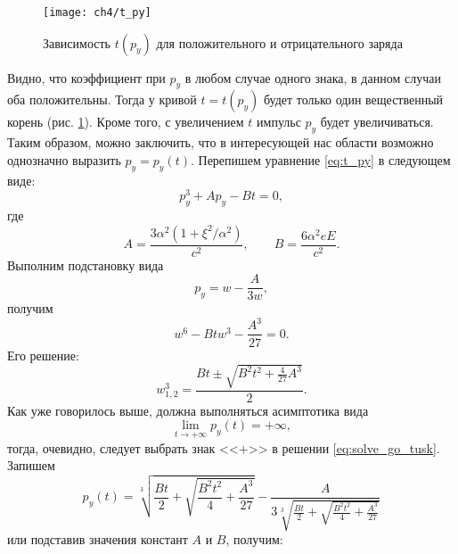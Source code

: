 \begin{figure}[h]
	\centering
	\texttt{[image: ch4/t\_py]}
	\caption{Зависимость $t(p_y)$ для положительного и отрицательного заряда}
	\label{fig:t_py}
\end{figure}

Видно, что коэффициент при $p_y$ в любом случае одного знака, в данном случаи оба положительны. Тогда у кривой $t = t(p_y)$ будет только один вещественный корень (рис. \ref{fig:t_py}). Кроме того, с увеличением $t$ импульс $p_y$ будет увеличиваться. Таким образом, можно заключить, что в интересующей нас области возможно однозначно выразить $p_y = p_y(t)$. Перепишем уравнение \eqref{eq:t_py} в следующем виде:
\begin{equation*}
p_y^3 + A p_y - B t = 0,
\end{equation*}
где
\begin{equation*}
A =  \frac{3 \alpha^2 (1 + \xi^2/\alpha^2)}{c^2}, \qquad B = \frac{6\alpha^2eE}{c^2}.
\end{equation*}
Выполним подстановку\cite{bronshtein-math} вида
\begin{equation*}
p_y = w - \frac{A}{3 w},
\end{equation*}
получим
\begin{equation*}
w^6 - Bt w^3 - \frac{A^3}{27} = 0.
\end{equation*}
Его решение:
\begin{equation}
w^3_{1,2} = \frac{ Bt \pm \sqrt{B^2 t^2 + \frac{4}{27}A^3}}{2}.
\label{eq:solve_go_tusk}
\end{equation}
Как уже говорилось выше, должна выполняться асимптотика вида 
$$\lim\limits_{t \to + \infty} p_y(t) =  +\infty, $$ 
тогда, очевидно, следует выбрать знак <<$+$>> в решении \eqref{eq:solve_go_tusk}. Запишем 
\begin{equation*}
p_y(t) = \sqrt[3]{\frac{Bt}{2} + \sqrt{\frac{B^2 t^2}{4} + \frac{A^3}{27}}} - \frac{A}{3 \sqrt[3]{\frac{Bt}{2} + \sqrt{\frac{B^2 t^2}{4} + \frac{A^3}{27}}}}
\end{equation*}
или подставив значения констант $A$ и $B$, получим:

